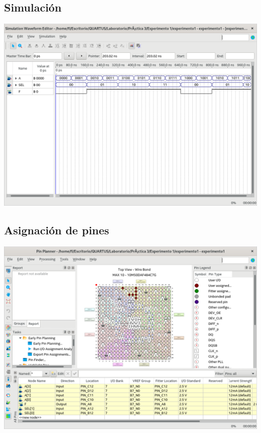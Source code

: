 \documentclass[10pt,a4paper]{article}
\begin{document}
	\subsection{Simulación}
	\begin{center}
		\includegraphics[scale=0.35]{Simulacion.png}
	\end{center}
	
	\subsection{Asignación de pines}
	\begin{center}
		\includegraphics[scale=0.35]{Pines.png}
	\end{center}
	
\end{document}
